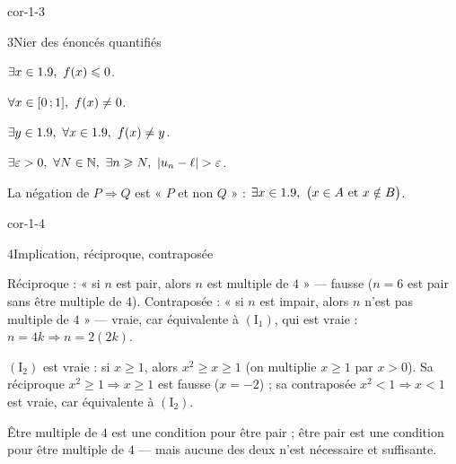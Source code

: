 \begin{blocLivre}{cor-1-3}
\begin{corrige}{3}{Nier des énoncés quantifiés}
\begin{questions}
  \item $\exists x\in1.9,\ f(x)\leqslant0$.
  \item $\forall x\in\intFF{0}{1},\ f(x)\neq0$.
  \item $\exists y\in1.9,\ \forall x\in1.9,\ f(x)\neq y$.
  \item $\exists\varepsilon>0,\ \forall N\in\N,\ \exists n\geq N,\ |u_n-\ell|>\varepsilon$.
  \item La négation de $P\Rightarrow Q$ est « $P$ et non $Q$ » :
    $\exists x\in\R,\ \bigl(x\in A\ \text{et}\ x\notin B\bigr)$.
\end{questions}
\end{corrige}
\end{blocLivre}

\begin{blocLivre}{cor-1-4}
\begin{corrige}{4}{Implication, réciproque, contraposée}
\begin{questions}
  \item Réciproque : « si $n$ est pair, alors $n$ est multiple de $4$ » — fausse ($n=6$ est pair sans être
    multiple de $4$). Contraposée : « si $n$ est impair, alors $n$ n'est pas multiple de $4$ » — vraie, car
    équivalente à $(\mathrm{I}_1)$, qui est vraie : $n=4k\Rightarrow n=2(2k)$.
  \item $(\mathrm{I}_2)$ est vraie : si $x\geq1$, alors $x^{2}\geq x\geq1$ (on multiplie $x\geq1$ par $x>0$).
    Sa réciproque $x^{2}\geq1\Rightarrow x\geq1$ est fausse ($x=-2$) ; sa contraposée
    $x^{2}<1\Rightarrow x<1$ est vraie, car équivalente à $(\mathrm{I}_2)$.
  \item Être multiple de $4$ est une condition  pour être pair ; être pair est une
    condition  pour être multiple de $4$ — mais aucune des deux n'est nécessaire
    et suffisante.
\end{questions}
\end{corrige}
\end{blocLivre}

